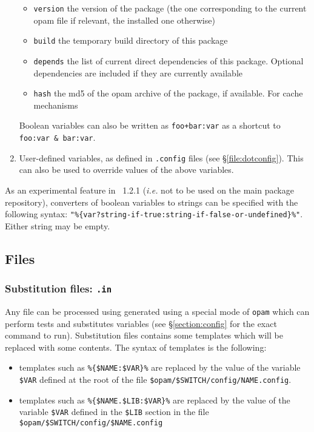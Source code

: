 \documentclass[a4paper,10pt]{article}
\begin{document}
\begin{enumerate}
\begin{itemize}
  \item \verb+version+ the version of the package (the one corresponding to the
    current opam file if relevant, the installed one otherwise)
  \item \verb+build+ the temporary build directory of this package
  \item \verb+depends+ the list of current direct dependencies of this package.
    Optional dependencies are included if they are currently available
  \item \verb+hash+ the md5 of the opam archive of the package, if available.
    For cache mechanisms
  \end{itemize}
  Boolean variables can also be written as \verb!foo+bar:var! as a shortcut to
  \verb!foo:var & bar:var!.
\item User-defined variables, as defined in {\tt *.config} files (see
  \S\ref{file:dotconfig}). This can also be used to override values of the above
  variables.
\end{enumerate}

As an experimental feature in \OPAM\ 1.2.1 ({\em i.e.} not to be used on the
main package repository), converters of boolean variables to strings can be
specified with the following syntax:
\verb+"%{var?string-if-true:string-if-false-or-undefined}%"+. Either string may
be empty.

\subsection{Files}

\subsubsection{Substitution files: {\tt *.in}}
\label{file:subst}

Any file can be processed using generated using a special mode of
{\tt opam} which can perform tests and substitutes variables (see
\S\ref{section:config} for the exact command to run). Substitution files
contains some templates which will be replaced with some contents. The
syntax of templates is the following:

\begin{itemize}

\item templates such as \verb+%{$NAME:$VAR}%+ are replaced by the value
  of the variable \verb+$VAR+ defined at the root of the file
  \verb+$opam/$SWITCH/config/NAME.config+.

\item templates such as \verb+%{$NAME.$LIB:$VAR}%+ are replaced by the
  value of the variable \verb+$VAR+ defined in the \verb+$LIB+ section
  in the file \verb+$opam/$SWITCH/config/$NAME.config+

\end{itemize}
\end{document}
